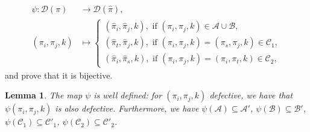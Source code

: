 \documentclass[12pt]{amsart}
\newtheorem{lem}[thm]{Lemma}
\theoremstyle{definition}
\numberwithin{equation}{section}
\newcommand{\A}{\mathcal{A}}
\newcommand{\B}{\mathcal{B}}
\newcommand{\C}{\mathcal{C}}
\newcommand{\D}{\mathcal{D}}
\begin{document}
\begin{equation}\label{eq:psidef}
\begin{aligned}
\psi: \D(\pi)&\to \D(\hat\pi),\\
(\pi_i,\pi_j,k)&\mapsto 
\begin{cases} 
(\hat\pi_i, \hat\pi_j,k),\text{ if } (\pi_i,\pi_j,k) \in \A \cup \B,\\
(\hat\pi_t, \hat\pi_j,k), \text{ if } (\pi_i, \pi_j, k) = (\pi_s, \pi_j, k) \in \C_1,\\
(\hat\pi_i,\hat\pi_s,k), \text{ if } (\pi_i, \pi_j, k) = (\pi_i, \pi_t, k) \in \C_2,
\end{cases}
\end{aligned}
\end{equation}
and prove that it is bijective.

\begin{lem}\label{l: well defined}
The map $\psi$ is well defined: for $(\pi_i, \pi_j, k)$ defective, we have that
$\psi(\pi_i, \pi_j, k)$ is also defective.  Furthermore, we have
    $\psi(\A) \subseteq \A'$,
    $\psi(\B) \subseteq \B'$,
    $\psi(\C_1) \subseteq \C'_1$,
    $\psi(\C_2) \subseteq \C'_2$.
\end{lem}
\end{document}

